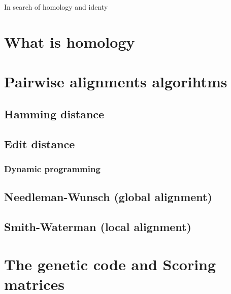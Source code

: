 \documentclass[
  letterpaper,
]{scrbook}
\begin{document}
In search of homology and identy

\hypertarget{what-is-homology}{%
\section*{What is homology}\label{what-is-homology}}

\hypertarget{pairwise-alignments-algorihtms}{%
\section*{Pairwise alignments
algorihtms}\label{pairwise-alignments-algorihtms}}

\hypertarget{hamming-distance}{%
\subsection*{Hamming distance}\label{hamming-distance}}

\hypertarget{edit-distance}{%
\subsection*{Edit distance}\label{edit-distance}}

\hypertarget{dynamic-programming}{%
\subsubsection{Dynamic programming}\label{dynamic-programming}}

\hypertarget{needleman-wunsch-global-alignment}{%
\subsection*{Needleman-Wunsch (global
alignment)}\label{needleman-wunsch-global-alignment}}

\hypertarget{smith-waterman-local-alignment}{%
\subsection*{Smith-Waterman (local
alignment)}\label{smith-waterman-local-alignment}}

\hypertarget{the-genetic-code-and-scoring-matrices}{%
\section*{The genetic code and Scoring
matrices}\label{the-genetic-code-and-scoring-matrices}}
\end{document}

